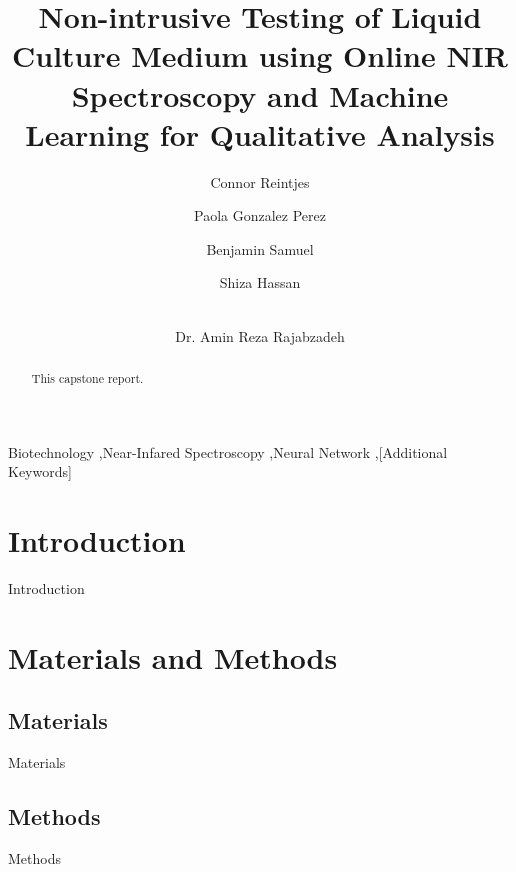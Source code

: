 \documentclass[final, 3p, 11pt]{elsarticle}
\begin{document}
\begin{frontmatter}


\title{Non-intrusive Testing of Liquid Culture Medium using Online NIR Spectroscopy and Machine Learning for Qualitative Analysis}

\author[1]{Connor Reintjes}
\author[1]{Paola Gonzalez Perez}
\author[1]{Benjamin Samuel}
\author[1]{Shiza Hassan}
\author[1]{\\Dr. Amin Reza Rajabzadeh} %



\begin{abstract}
This capstone report.
\end{abstract}

\begin{keyword}
Biotechnology \sep Near-Infared Spectroscopy \sep Neural Network \sep [Additional Keywords]
\end{keyword}

\end{frontmatter}

\section{Introduction}
Introduction

\section{Materials and Methods}
\subsection{Materials}
Materials

\subsection{Methods}
Methods
\end{document}

